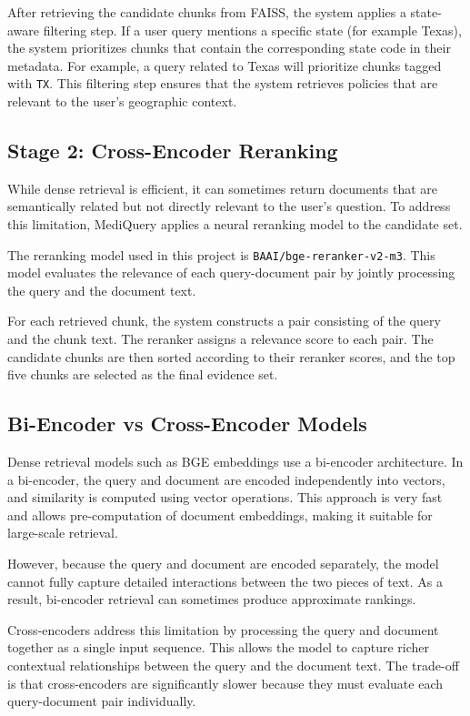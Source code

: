 \documentclass[10pt, letterpaper]{article}
\begin{document}
After retrieving the candidate chunks from FAISS, the system applies a state-aware filtering step. If a user query mentions a specific state (for example Texas), the system prioritizes chunks that contain the corresponding state code in their metadata. For example, a query related to Texas will prioritize chunks tagged with \texttt{TX}. This filtering step ensures that the system retrieves policies that are relevant to the user's geographic context.

\subsection{Stage 2: Cross-Encoder Reranking}

While dense retrieval is efficient, it can sometimes return documents that are semantically related but not directly relevant to the user's question. To address this limitation, MediQuery applies a neural reranking model to the candidate set.

The reranking model used in this project is \texttt{BAAI/bge-reranker-v2-m3}. This model evaluates the relevance of each query-document pair by jointly processing the query and the document text.

For each retrieved chunk, the system constructs a pair consisting of the query and the chunk text. The reranker assigns a relevance score to each pair. The candidate chunks are then sorted according to their reranker scores, and the top five chunks are selected as the final evidence set.

\subsection{Bi-Encoder vs Cross-Encoder Models}

Dense retrieval models such as BGE embeddings use a bi-encoder architecture. In a bi-encoder, the query and document are encoded independently into vectors, and similarity is computed using vector operations. This approach is very fast and allows pre-computation of document embeddings, making it suitable for large-scale retrieval.

However, because the query and document are encoded separately, the model cannot fully capture detailed interactions between the two pieces of text. As a result, bi-encoder retrieval can sometimes produce approximate rankings.

Cross-encoders address this limitation by processing the query and document together as a single input sequence. This allows the model to capture richer contextual relationships between the query and the document text. The trade-off is that cross-encoders are significantly slower because they must evaluate each query-document pair individually.
\end{document}
